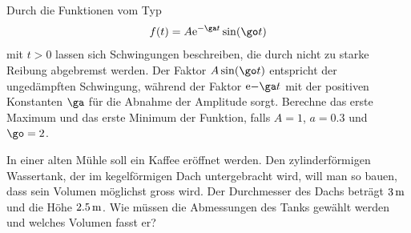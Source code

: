 \documentclass[%
11pt,%
twoside,%
titlepage,%
german,%
headsepline%
]{scrartcl}
\begin{document}
\begin{ueb}
Durch
die Funktionen vom Typ
$$f(t)=A\mathrm{e}^{-\ga t}\sin(\go t)$$
mit $t>0$ lassen sich Schwingungen beschreiben, die durch nicht zu starke Reibung abgebremst werden. Der Faktor $A\sin(\go t)$ entspricht der unged\"ampften Schwingung, w\"ahrend der Faktor $\mathrm{e}{-\ga t}$ mit der positiven Konstanten $\ga$ f\"ur die Abnahme der Amplitude sorgt. Berechne das erste Maximum und das erste Minimum der Funktion, falls $A = 1$, $a = 0.3$ und $\go=2$.
\end{ueb}

\begin{ueb}[Mühle]
In einer alten M\"uhle soll ein Kaffee er\"offnet werden. Den zylinderf\"ormigen Wassertank, der im kegelf\"ormigen Dach untergebracht wird, will man so bauen, dass sein Volumen m\"oglichst gross wird. Der Durchmesser des Dachs betr\"agt $\unit[3]{m}$ und die H\"ohe $\unit[2.5]{m}$. Wie m\"ussen die Abmessungen des Tanks gew\"ahlt werden und welches Volumen fasst er?\\[3ex]


\end{ueb}
\end{document}

